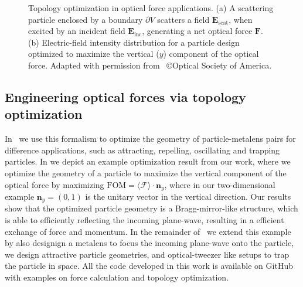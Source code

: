 \begin{figure}[tb]
    \centering
    \caption{Topology optimization in optical force applications. (a) A scattering particle 
    enclosed by a boundary $\partial V$ scatters a field $\mathbf{E}_\text{scat}$, when excited by an incident field $\mathbf{E}_\text{inc}$, 
    generating a net optical force $\mathbf{F}$. (b) Electric-field intensity distribution for a particle design optimized to maximize the vertical ($y$)
    component of the optical force. Adapted with permission from~\cite{ownpub2} \copyright Optical Society of America.}
    \label{fig:eng_res}
\end{figure}

\subsection*{Engineering optical forces via topology optimization}

In~\cite{ownpub3} we use this formalism to optimize the geometry of particle-metalens pairs for difference applications, such as attracting, repelling, 
oscillating and trapping particles. In  we depict an example optimization result from our work, where 
we optimize the geometry of a particle to maximize the vertical component of the optical force by maximizing $\text{FOM} = \langle\bm{\mathcal{F}}\rangle \cdot \mathbf{n}_y$, where
in our two-dimensional example $\mathbf{n}_y = (0, 1)$ is the unitary vector in the vertical direction.  Our results show that the optimized particle geometry is a Bragg-mirror-like
structure, which is able to efficiently reflecting the incoming plane-wave, resulting in a efficient exchange of force and momentum. In the remainder of~\cite{ownpub3} we extend this example by also designign a metalens to focus the incoming plane-wave onto the particle,
we design attractive particle geometries, and optical-tweezer like setups to trap the particle in space. All the code developed in this work is available on GitHub~\cite{github_MST} with examples on force calculation and topology optimization. 

